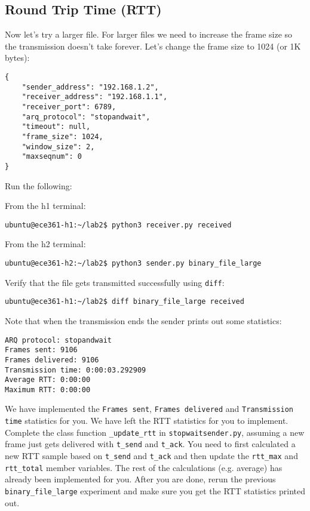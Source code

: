 \documentclass[11pt]{article}
\begin{document}
\subsection{Round Trip Time (RTT)}
Now let's try a larger file. For larger files we need to increase the frame size so the transmission doesn't take forever. Let's change the frame size to 1024 (or 1K bytes):
\begin{lstlisting}[style=ece361-shell-base, caption={Configuration For Large File}]
{
    "sender_address": "192.168.1.2",
    "receiver_address": "192.168.1.1",
    "receiver_port": 6789,
    "arq_protocol": "stopandwait",
    "timeout": null,
    "frame_size": 1024,
    "window_size": 2,
    "maxseqnum": 0
}
\end{lstlisting}
Run the following:

From the h1 terminal:
\begin{lstlisting}[style=ece361-shell-base, caption={}]
ubuntu@ece361-h1:~/lab2$ python3 receiver.py received
\end{lstlisting}

From the h2 terminal:
\begin{lstlisting}[style=ece361-shell-base, caption={}]
ubuntu@ece361-h2:~/lab2$ python3 sender.py binary_file_large
\end{lstlisting}


Verify that the file gets transmitted successfully using \texttt{diff}:
\begin{lstlisting}[style=ece361-shell-base, caption={}]
ubuntu@ece361-h1:~/lab2$ diff binary_file_large received
\end{lstlisting}

Note that when the transmission ends the sender prints out some statistics:

\begin{lstlisting}[style=ece361-shell-base, caption={}]
ARQ protocol: stopandwait
Frames sent: 9106
Frames delivered: 9106
Transmission time: 0:00:03.292909
Average RTT: 0:00:00
Maximum RTT: 0:00:00
\end{lstlisting}

We have implemented the \texttt{Frames sent}, \texttt{Frames delivered} and \texttt{Transmission time} statistics for you.
We have left the RTT statistics for you to implement.
Complete the class function \texttt{\_update\_rtt} in \texttt{stopwaitsender.py}, assuming a new frame just gets delivered with \texttt{t\_send} and \texttt{t\_ack}.
You need to first calculated a new RTT sample based on \texttt{t\_send} and \texttt{t\_ack} and then update the \texttt{rtt\_max} and \texttt{rtt\_total} member variables.
The rest of the calculations (e.g. average) has already been implemented for you.
After you are done, rerun the previous \texttt{binary\_file\_large} experiment and make sure you get the RTT statistics printed out.
\end{document}
